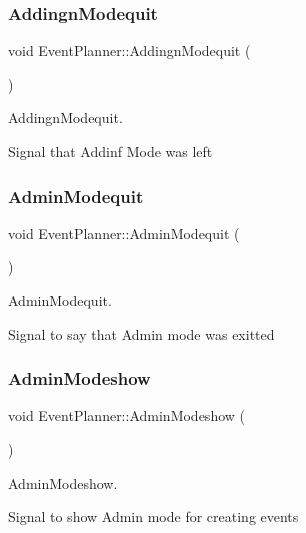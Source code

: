\subsubsection{\texorpdfstring{Addingn\+Modequit}{AddingnModequit}}
{\footnotesize\ttfamily void Event\+Planner\+::\+Addingn\+Modequit (\begin{DoxyParamCaption}{ }\end{DoxyParamCaption})\hspace{0.3cm}{\ttfamily [signal]}}



Addingn\+Modequit. 

Signal that Addinf Mode was left \mbox{\label{class_event_planner_ab721a944eda1470ebb158bc815cc8734}} 
\subsubsection{\texorpdfstring{Admin\+Modequit}{AdminModequit}}
{\footnotesize\ttfamily void Event\+Planner\+::\+Admin\+Modequit (\begin{DoxyParamCaption}{ }\end{DoxyParamCaption})\hspace{0.3cm}{\ttfamily [signal]}}



Admin\+Modequit. 

Signal to say that Admin mode was exitted \mbox{\label{class_event_planner_ae781e84143069d552b60b7856e7b0ad6}} 
\subsubsection{\texorpdfstring{Admin\+Modeshow}{AdminModeshow}}
{\footnotesize\ttfamily void Event\+Planner\+::\+Admin\+Modeshow (\begin{DoxyParamCaption}{ }\end{DoxyParamCaption})\hspace{0.3cm}{\ttfamily [signal]}}



Admin\+Modeshow. 

Signal to show Admin mode for creating events \mbox{\label{class_event_planner_a3c7b9e879f05ecb64f1d893084b1101c}} 
